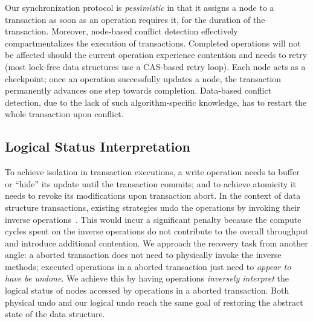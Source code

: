 \documentclass[]{sig-alternate-05-2015}
\begin{document}
Our synchronization protocol is \emph{pessimistic} in that it assigns a node to a transaction as soon as an operation requires it, for the duration of the transaction.
Moreover, node-based conflict detection effectively compartmentalizes the execution of transactions.
Completed operations will not be affected should the current operation experience contention and needs to retry (most lock-free data structures use a CAS-based retry loop). 
Each node acts as a checkpoint; once an operation successfully updates a node, the transaction permanently advances one step towards completion.
Data-based conflict detection, due to the lack of such algorithm-specific knowledge, has to restart the whole transaction upon conflict. 

\subsection{Logical Status Interpretation}
\label{sec:logical}
To achieve isolation in transaction executions, a write operation needs to buffer or ``hide'' its update until the transaction commits; and to achieve atomicity it needs to revoke its modifications upon transaction abort.
In the context of data structure transactions, existing strategies undo the operations by invoking their inverse operations~\cite{herlihy2008transactional}.
This would incur a significant penalty because the compute cycles spent on the inverse operations do not contribute to the overall throughput and introduce additional contention.
We approach the recovery task from another angle: a aborted transaction does not need to physically invoke the inverse methods; executed operations in a aborted transaction just need to \emph{appear to have be undone}.
We achieve this by having operations \emph{inversely interpret} the logical status of nodes accessed by operations in a aborted transaction.
Both physical undo and our logical undo reach the same goal of restoring the abstract state of the data structure. 
\end{document}
